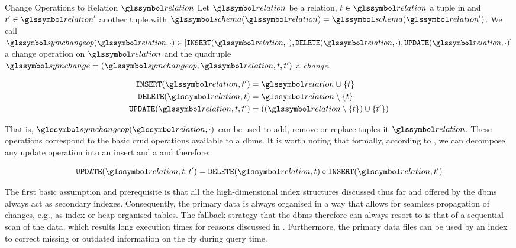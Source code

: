 \begin{definition}[label=definition:change]{Change Operations to Relation $\relation$}{}
    Let $\relation$ be a relation, $t \in \relation$ a tuple in and $t^{\prime} \in \relation^{\prime}$ another tuple with $\schema(\relation) = \schema(\relation^{\prime})$. We call $\symchangeop(\relation,\cdot) \in [ \mathtt{INSERT}(\relation, \cdot), \mathtt{DELETE}(\relation, \cdot), \mathtt{UPDATE}(\relation, \cdot) ]$ a change operation on $\relation$ and the quadruple $\symchange = (\symchangeop, \relation, t, t^{\prime})$ a \emph{change}.

    \begin{align*}
        \mathtt{INSERT}(\relation, t^{\prime}) &= \relation \cup \lbrace t \rbrace \\
        \mathtt{DELETE}(\relation, t ) &= \relation \setminus \lbrace t \rbrace \\
        \mathtt{UPDATE}(\relation, t, t^{\prime}) &= ((\relation \setminus \lbrace t \rbrace) \cup \lbrace t^{\prime} \rbrace)\\
    \end{align*}

    That is, $\symchangeop(\relation,\cdot)$ can be used to add, remove or replace tuples it $\relation$. These operations correspond to the basic \acrshort{crud} operations available to a \acrshort{dbms}. It is worth noting that formally, according to , we can decompose any update operation into an insert and a and therefore:

    \begin{equation*}
    \mathtt{UPDATE}(\relation, t, t^{\prime}) = \mathtt{DELETE}(\relation, t ) \circ \mathtt{INSERT}(\relation, t^{\prime})
    \end{equation*}
\end{definition}

The first basic assumption and prerequisite is that all the high-dimensional index structures discussed thus far and offered by the \acrshort{dbms} always act as secondary indexes. Consequently, the primary data is always organised in a way that allows for seamless propagation of changes, e.g., as index or heap-organised tables. The fallback strategy that the \acrshort{dbms} therefore can always resort to is that of a sequential scan of the data, which results long execution times for reasons discussed in . Furthermore, the primary data files can be used by an index to correct missing or outdated information on the fly during query time.


